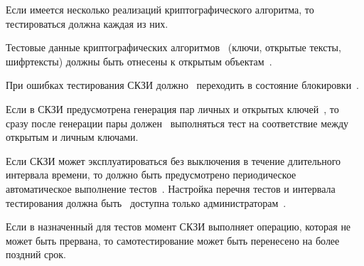 \begin{note}
Если имеется несколько реализаций криптографического алгоритма, 
то тестироваться должна каждая из них.
\end{note}

\label{R.ST.TestData}
Тестовые данные криптографических алгоритмов~ 
(ключи, открытые тексты, шифртексты) 
должны быть отнесены к открытым объектам~.

\label{R.ST.TestLock}
При ошибках тестирования СКЗИ должно~ 
переходить в состояние блокировки~.

\label{R.ST.TestKeypair}
Если в СКЗИ предусмотрена генерация пар личных и открытых 
ключей~, то сразу после генерации пары  
должен~ выполняться тест на соответствие между открытым и 
личным ключами. 

\label{R.ST.Periodic}
Если СКЗИ может эксплуатироваться без выключения в течение длительного интервала
времени, то должно быть предусмотрено периодическое автоматическое выполнение 
тестов~. Настройка перечня тестов и интервала тестирования
должна быть~ доступна только 
администраторам~.

\begin{note}
Если в назначенный для тестов момент СКЗИ выполняет операцию, которая не может 
быть прервана, то самотестирование может быть перенесено на более поздний срок.
\end{note}
